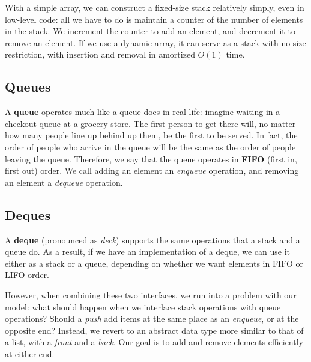 With a simple array, we can construct a fixed-size stack relatively simply, even in low-level code: all we have to do is maintain a counter of the number of elements in the stack. We increment the counter to add an element, and decrement it to remove an element. If we use a dynamic array, it can serve as a stack with no size restriction, with insertion and removal in amortized $O(1)$ time.


\subsection{Queues}

A \textbf{queue} operates much like a queue does in real life: imagine waiting in a checkout queue at a grocery store. The first person to get there will, no matter how many people line up behind up them, be the first to be served. In fact, the order of people who arrive in the queue will be the same as the order of people leaving the queue. Therefore, we say that the queue operates in \textbf{FIFO} (first in, first out) order. We call adding an element an \textit{enqueue} operation, and removing an element a \textit{dequeue} operation.


\subsection{Deques} \label{sec:deque}



A \textbf{deque} (pronounced as \textit{deck}) supports the same operations that a stack and a queue do. As a result, if we have an implementation of a deque, we can use it either as a stack or a queue, depending on whether we want elements in FIFO or LIFO order. 

However, when combining these two interfaces, we run into a problem with our model: what should happen when we interlace stack operations with queue operations? Should a \textit{push} add items at the same place as an \textit{enqueue}, or at the opposite end? Instead, we revert to an abstract data type more similar to that of a list, with a \textit{front} and a \textit{back}. Our goal is to add and remove elements efficiently at either end.

